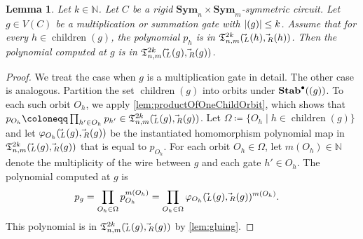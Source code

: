 \documentclass[10pt,a4paper]{article}
\theoremstyle{definition}
\theoremstyle{plain}
\newtheorem{lemma}[definition]{Lemma}
\theoremstyle{remark}
\renewcommand{\phi}{\varphi}
\newcommand{\Sym}{\mathbf{Sym}}
\newcommand{\Stab}{\mathbf{Stab}}
\newcommand{\StabP}{\Stab^{\bullet}}
\DeclareMathOperator{\child}{children}
\newcommand{\bbN}{\mathbb{N}}
\let\sup\relax
\DeclareMathOperator{\sup}{sup}
\begin{document}
 	 \begin{lemma}
 		\label{lem:productOfAllChildOrbits}
 		Let $k \in \bbN$. 
 		Let $C$ be a rigid $\Sym_{n} \times \Sym_{m}$-symmetric circuit. 
 		Let $g \in V(C)$ be a multiplication or summation gate with $|\sup(g)| \leq k$.
 		Assume that for every $h \in \child(g)$, the polynomial $p_h$ is in $\mathfrak{T}_{n,m}^{2k}(\vec{\sup}_L(h), \vec{\sup}_R(h))$.
 		Then the polynomial computed at $g$ is in $\mathfrak{T}_{n,m}^{2k}(\vec{\sup}_L(g), \vec{\sup}_R(g))$.
 	\end{lemma}	
 	\begin{proof}
 		We treat the case when $g$ is a multiplication gate in detail.
 		The other case is analogous.
 		Partition the set $\child(g)$ into orbits under $\StabP(\sup(g))$. 
		To each such orbit $O_h$, we apply \cref{lem:productOfOneChildOrbit}, 
		which shows that $p_{O_h} \coloneqq \prod_{h' \in O_h} p_{h'} \in \mathfrak{T}^{2k}_{n,m}(\vec{\sup}_L(g), \vec{\sup}_R(g))$.
		Let $\Omega \coloneqq \{O_h \mid h \in \child(g)\}$ and let $\phi_{O_h}(\vec{\sup}_L(g), \vec{\sup}_R(g))$ be the instantiated homomorphism polynomial map in $\mathfrak{T}^{2k}_{n,m}(\vec{\sup}_L(g), \vec{\sup}_R(g))$ that is equal to $p_{O_h}$. For each orbit $O_h \in \Omega$, let $m(O_h) \in \bbN$ denote the multiplicity of the wire between $g$ and each gate $h' \in O_h$.
 		The polynomial computed at $g$ is 
 		\begin{align*}
 			p_g = \prod_{O_h \in \Omega} p_{O_h}^{m(O_h)} &= \prod_{O_h \in \Omega} \phi_{O_h}(\vec{\sup}_L(g), \vec{\sup}_R(g))^{m(O_h)}.
 		\end{align*}	
 		This polynomial is in $\mathfrak{T}_{n,m}^{2k}(\vec{\sup}_L(g), \vec{\sup}_R(g))$ by \cref{lem:gluing}.
 	\end{proof}	
 	
\end{document}

